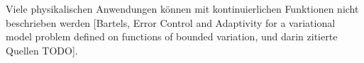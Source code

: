 %

Viele physikalischen Anwendungen können mit kontinuierlichen Funktionen nicht
beschrieben werden [Bartels, Error Control and Adaptivity for a variational
model problem defined on functions of bounded variation, und darin zitierte
Quellen TODO].
